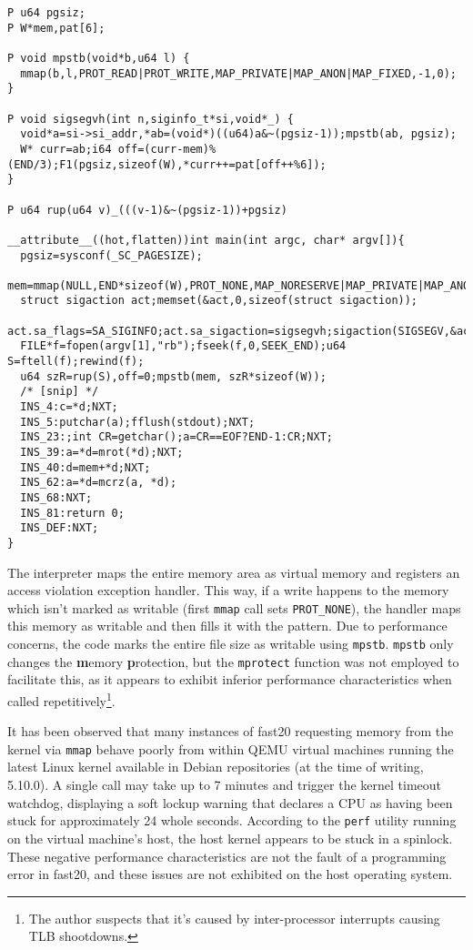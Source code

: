 \begin{verbatim}
P u64 pgsiz;
P W*mem,pat[6];

P void mpstb(void*b,u64 l) {
  mmap(b,l,PROT_READ|PROT_WRITE,MAP_PRIVATE|MAP_ANON|MAP_FIXED,-1,0);
}

P void sigsegvh(int n,siginfo_t*si,void*_) {
  void*a=si->si_addr,*ab=(void*)((u64)a&~(pgsiz-1));mpstb(ab, pgsiz);  
  W* curr=ab;i64 off=(curr-mem)%(END/3);F1(pgsiz,sizeof(W),*curr++=pat[off++%6]);
}

P u64 rup(u64 v)_(((v-1)&~(pgsiz-1))+pgsiz)

__attribute__((hot,flatten))int main(int argc, char* argv[]){
  pgsiz=sysconf(_SC_PAGESIZE);
  mem=mmap(NULL,END*sizeof(W),PROT_NONE,MAP_NORESERVE|MAP_PRIVATE|MAP_ANON,-1,0);
  struct sigaction act;memset(&act,0,sizeof(struct sigaction));
  act.sa_flags=SA_SIGINFO;act.sa_sigaction=sigsegvh;sigaction(SIGSEGV,&act,NULL);
  FILE*f=fopen(argv[1],"rb");fseek(f,0,SEEK_END);u64 S=ftell(f);rewind(f);
  u64 szR=rup(S),off=0;mpstb(mem, szR*sizeof(W));
  /* [snip] */
  INS_4:c=*d;NXT;
  INS_5:putchar(a);fflush(stdout);NXT;
  INS_23:;int CR=getchar();a=CR==EOF?END-1:CR;NXT;
  INS_39:a=*d=mrot(*d);NXT;
  INS_40:d=mem+*d;NXT;
  INS_62:a=*d=mcrz(a, *d);
  INS_68:NXT;
  INS_81:return 0;
  INS_DEF:NXT;
}
\end{verbatim}

\par The interpreter maps the entire memory area as virtual memory and registers an access violation exception handler. This way, if a write happens to the memory which isn't marked as writable (first \verb|mmap| call sets \verb|PROT_NONE|), the handler maps this memory as writable and then fills it with the pattern. Due to performance concerns, the code marks the entire file size as writable using \verb|mpstb|. \verb|mpstb| only changes the \textbf{m}emory \textbf{p}rotection, but the \verb|mprotect| function was not employed to facilitate this, as it appears to exhibit inferior performance characteristics when called repetitively\footnote{The author suspects that it's caused by inter-processor interrupts causing TLB shootdowns.}.

\par It has been observed that many instances of fast20 requesting memory from the kernel via \verb|mmap| behave poorly from within QEMU virtual machines running the latest Linux kernel available in Debian repositories (at the time of writing, 5.10.0). A single call may take up to 7 minutes and trigger the kernel timeout watchdog, displaying a soft lockup warning that declares a CPU as having been stuck for approximately 24 whole seconds. According to the \verb|perf| utility running on the virtual machine's host, the host kernel appears to be stuck in a spinlock. These negative performance characteristics are not the fault of a programming error in fast20, and these issues are not exhibited on the host operating system.

